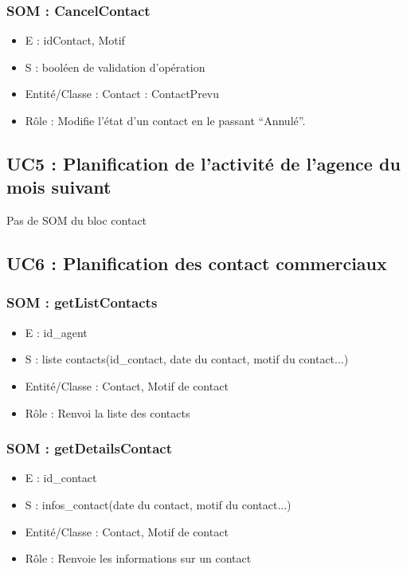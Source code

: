 \subsubsection{SOM : CancelContact}
	\begin{itemize}
		\item E : idContact, Motif
		\item S : booléen de validation d’opération
		\item Entité/Classe : Contact : ContactPrevu
		\item Rôle : Modifie l’état d’un contact en le passant “Annulé”.
	\end{itemize}



\subsection{UC5 : Planification de l’activité de l’agence du mois suivant}
Pas de SOM du bloc contact



\subsection{UC6 : Planification des contact commerciaux}
\subsubsection{SOM : getListContacts}
	\begin{itemize}
		\item E : id\_agent
		\item S : liste contacts(id\_contact, date du contact, motif du contact...)
		\item Entité/Classe : Contact, Motif de contact
		\item Rôle : Renvoi la liste des contacts
	\end{itemize}

\subsubsection{SOM : getDetailsContact}
	\begin{itemize}
		\item E : id\_contact
		\item S : infos\_contact(date du contact, motif du contact...)
		\item Entité/Classe : Contact, Motif de contact
		\item Rôle : Renvoie les informations sur un contact
	\end{itemize}

